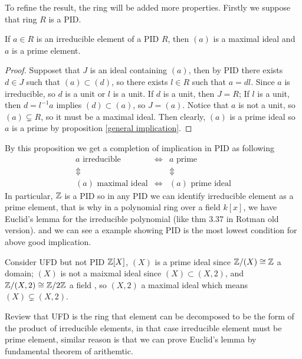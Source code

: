\documentclass[en,geye,blue,normal,12pt]{elegantnote}
\begin{document}
To refine the result, the ring will be added more properties. Firstly we suppose that ring \(R\) is a PID.
\begin{proposition} \label{PID maximal ideal}
  If \(a \in R\) is an irreducible element of a PID \(R\), then \((a)\) is a maximal ideal and \(a\) is a prime element.
  
  \begin{proof}
    Supposet that \(J\) is an ideal containing \((a)\), then by PID there exists \(d \in J\) such that \((a) \subset (d)\), so there exists \(l \in R\) such that \(a = dl\). Since \(a\) is irreducible, so \(d\) is a unit or \(l\) is a unit. If \(d\) is a unit, then \(J=R\); If \(l\) is a unit, then \(d = l^{-1}a\) implies \((d) \subset (a)\), so \(J=(a)\). Notice that \(a\) is not a unit, so \((a) \subsetneq R\), so it must be a maximal ideal. Then clearly, \((a)\) is a prime ideal so \(a\) is a prime by proposition \ref{general implication}.
  \end{proof}
\end{proposition}

By this proposition we get a completion of implication in PID as following
\[
\begin{array}{ccc}
a \text{ irreducible} & \Leftrightarrow & a \text{ prime} \\
\Updownarrow  &  & \Updownarrow \\
(a) \text{ maximal ideal} & \Leftrightarrow & (a) \text{ prime ideal}
\end{array}
\]
In particular, \(\mathbb{Z}\) is a PID so in any PID we can identify irreducible element as a prime element, that is why in a polynomial ring over a field \(k[x]\), we have Euclid's lemma for the irreducible polynomial (like thm 3.37 in Rotman old version). and we can see a example showing PID is the most lowest condition for above good implication.
\begin{example}
  Consider UFD but not PID \(\mathbb{Z}[X]\), \((X)\) is a prime ideal since \(\mathbb{Z}/(X) \cong \mathbb{Z}\) a domain; \((X)\) is not a maixmal ideal since \((X) \subset (X,2)\), and \(\mathbb{Z}/(X,2) \cong \mathbb{Z}/2\mathbb{Z}\) a field , so \((X,2)\) a maximal ideal which means \((X) \subsetneq (X,2)\).
\end{example}

Review that UFD is the ring that element can be decomposed to be the form of the product of irreducible elements, in that case irreducible element must be prime element, similar reason is that we can prove Euclid's lemma by fundamental theorem of arithemtic.
\end{document}
